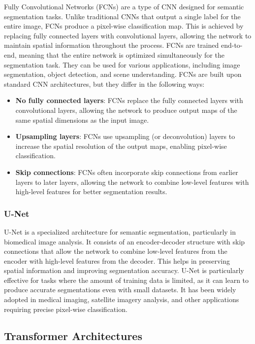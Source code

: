 Fully Convolutional Networks (FCNs) are a type of CNN designed for semantic segmentation tasks. Unlike traditional CNNs that output a single label for the entire image, FCNs produce a pixel-wise classification map. This is achieved by replacing fully connected layers with convolutional layers, allowing the network to maintain spatial information throughout the process.
FCNs are trained end-to-end, meaning that the entire network is optimized simultaneously for the segmentation task. They can be used for various applications, including image segmentation, object detection, and scene understanding.
FCNs are built upon standard CNN architectures, but they differ in the following ways:
\begin{itemize}
   \item \textbf{No fully connected layers}: FCNs replace the fully connected layers with convolutional layers, allowing the network to produce output maps of the same spatial dimensions as the input image.
   \item \textbf{Upsampling layers}: FCNs use upsampling (or deconvolution) layers to increase the spatial resolution of the output maps, enabling pixel-wise classification.
   \item \textbf{Skip connections}: FCNs often incorporate skip connections from earlier layers to later layers, allowing the network to combine low-level features with high-level features for better segmentation results.
\end{itemize}

\subsubsection{U-Net}

U-Net is a specialized architecture for semantic segmentation, particularly in biomedical image analysis. It consists of an encoder-decoder structure with skip connections that allow the network to combine low-level features from the encoder with high-level features from the decoder. This helps in preserving spatial information and improving segmentation accuracy.
U-Net is particularly effective for tasks where the amount of training data is limited, as it can learn to produce accurate segmentations even with small datasets. It has been widely adopted in medical imaging, satellite imagery analysis, and other applications requiring precise pixel-wise classification.

\subsection{Transformer Architectures}

